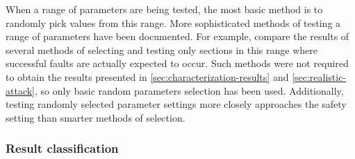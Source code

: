 \documentclass[10pt]{article}
\begin{document}
      When a range of parameters are being tested, the most basic method is to randomly pick values from this range. More sophisticated methods of testing a range of parameters have been documented. For example, \citet{carpi_glitch_2013} compare the results of several methods of selecting and testing only sections in this range where successful faults are actually expected to occur. Such methods were not required to obtain the results presented in \autoref{sec:characterization-results} and \autoref{sec:realistic-attack}, so only basic random parameters selection has been used. Additionally, testing randomly selected parameter settings more closely approaches the safety setting than smarter methods of selection. 

    \subsubsection{Result classification }
    \label{sec:classification}
\end{document}
